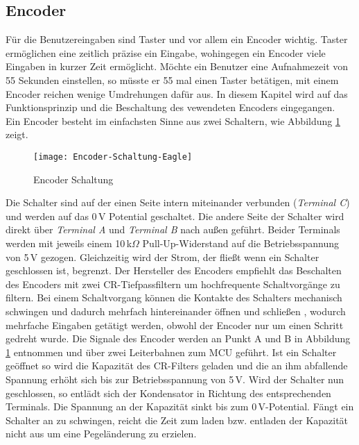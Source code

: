 
\subsection{Encoder}
\label{sec:Encoder}
Für die Benutzereingaben sind Taster und vor allem ein Encoder wichtig. Taster ermöglichen eine zeitlich präzise ein Eingabe, wohingegen ein Encoder viele Eingaben in kurzer Zeit ermöglicht. Möchte ein Benutzer eine Aufnahmezeit von 55 Sekunden einstellen, so müsste er 55 mal einen Taster betätigen, mit einem Encoder reichen wenige Umdrehungen dafür aus. In diesem Kapitel wird auf das Funktionsprinzip und die Beschaltung des vewendeten Encoders eingegangen.\\
Ein Encoder besteht im einfachsten Sinne aus zwei Schaltern, wie Abbildung \ref{fig:Encoder-Schaltung} zeigt. 
\begin{figure}[h]
	\begin{center}
		\texttt{[image: Encoder-Schaltung-Eagle]}
		\caption{Encoder Schaltung \cite{EncoderMN}}
		\label{fig:Encoder-Schaltung}
	\end{center}
\end{figure}
Die Schalter sind auf der einen Seite intern miteinander verbunden (\textit{Terminal C}) und werden auf das 0\,V Potential geschaltet. Die andere Seite der Schalter wird direkt über \textit{Terminal A} und \textit{Terminal B} nach außen geführt. 
Beider Terminals werden mit jeweils einem 10\,k$\Omega$ Pull-Up-Widerstand auf die Betriebsspannung von 5\,V gezogen. Gleichzeitig wird der Strom, der fließt wenn ein Schalter geschlossen ist, begrenzt. Der Hersteller des Encoders empfiehlt das Beschalten des Encoders mit zwei CR-Tiefpassfiltern um hochfrequente Schaltvorgänge zu filtern. Bei einem Schaltvorgang können die Kontakte des Schalters mechanisch schwingen und dadurch mehrfach hintereinander öffnen und schließen \cite[S. 67]{TechInfo}, wodurch mehrfache Eingaben getätigt werden, obwohl der Encoder nur um einen Schritt gedreht wurde. Die Signale des Encoder werden an Punkt A und B in Abbildung \ref{fig:Encoder-Schaltung} entnommen und über zwei Leiterbahnen zum MCU geführt. Ist ein Schalter geöffnet so wird die Kapazität des CR-Filters geladen und die an ihm abfallende Spannung erhöht sich bis zur Betriebsspannung von 5\,V. Wird der Schalter nun geschlossen, so entlädt sich der Kondensator in Richtung des entsprechenden Terminals. Die Spannung an der Kapazität sinkt bis zum 0\,V-Potential. Fängt ein Schalter an zu schwingen, reicht die Zeit zum laden bzw. entladen der Kapazität nicht aus um eine Pegeländerung zu erzielen. 
